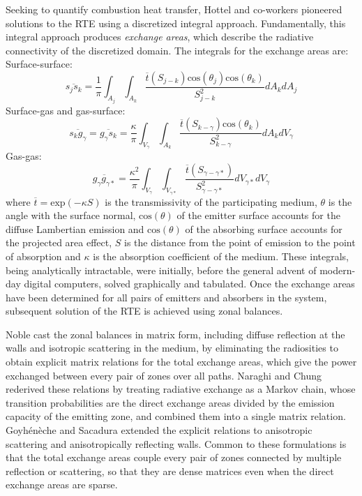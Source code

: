 \documentclass[preprint,1p,times]{elsarticle}
\theoremstyle{plain}
\theoremstyle{definition}
\theoremstyle{remark}
\begin{document}
Seeking to quantify combustion heat transfer, Hottel and co-workers \citep{Hottel1958, Hottel1967} pioneered solutions to the RTE using a discretized integral approach. Fundamentally, this integral approach produces \textit{exchange areas}, which describe the radiative connectivity of the discretized domain. The integrals for the exchange areas are:\\
Surface-surface:
\begin{equation}
	\overline{s_j s_k} = \frac{1}{\pi}\int_{A_j}\int_{A_k} \frac{\overline{t}(S_{j-k})\mathrm{cos}(\theta_j)\mathrm{cos}(\theta_k)}{S^2_{j-k}}dA_k dA_j
	\label{eq:viewfactor_surfsurf}
\end{equation}
Surface-gas and gas-surface:
\begin{equation}
	\overline{s_k g_\gamma} = \overline{g_\gamma s_k} = \frac{\kappa}{\pi} \int_{V_\gamma}\int_{A_k}\frac{\overline{t}(S_{k-\gamma}) \mathrm{cos}(\theta_k)}{S^2_{k-\gamma}} dA_k dV_\gamma
	\label{eq:viewfactor_gassurf}
\end{equation}
Gas-gas:
\begin{equation}
	\overline{g_\gamma g_{\gamma*}} = \frac{\kappa^2}{\pi} \int_{V_\gamma}\int_{V_{\gamma*}} \frac{\overline{t}(S_{\gamma-\gamma*})}{S^2_{\gamma-\gamma*}}dV_{\gamma*} dV_\gamma
	\label{eq:viewfactor_gasgas}
\end{equation}
where $\overline{t}=\mathrm{exp}(-\kappa S)$ is the transmissivity of the participating medium, $\theta$ is the angle with the surface normal, $\mathrm{cos}(\theta)$ of the emitter surface accounts for the diffuse Lambertian emission and $\mathrm{cos}(\theta)$ of the absorbing surface accounts for the projected area effect, $S$ is the distance from the point of emission to the point of absorption and $\kappa$ is the absorption coefficient of the medium. These integrals, being analytically intractable, were initially, before the general advent of modern-day digital computers, solved graphically and tabulated. Once the exchange areas have been determined for all pairs of emitters and absorbers in the system, subsequent solution of the RTE is achieved using zonal balances.

Noble \citep{Noble1975} cast the zonal balances in matrix form, including diffuse reflection at the walls and isotropic scattering in the medium, by eliminating the radiosities to obtain explicit matrix relations for the total exchange areas, which give the power exchanged between every pair of zones over all paths. Naraghi and Chung \citep{Naraghi1985} rederived these relations by treating radiative exchange as a Markov chain, whose transition probabilities are the direct exchange areas divided by the emission capacity of the emitting zone, and combined them into a single matrix relation. Goyhénèche and Sacadura \citep{Goyheneche2002} extended the explicit relations to anisotropic scattering and anisotropically reflecting walls. Common to these formulations is that the total exchange areas couple every pair of zones connected by multiple reflection or scattering, so that they are dense matrices even when the direct exchange areas are sparse.
\end{document}
